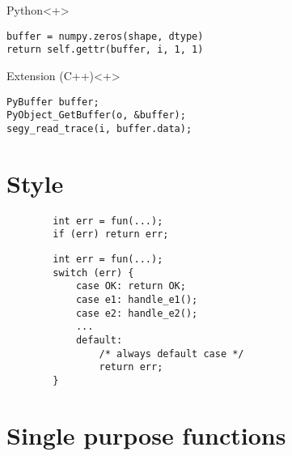 \documentclass[pdf]{beamer}
\begin{document}
\begin{frame}[fragile]
    \begin{block}{Python}<+>
        \begin{lstlisting}
buffer = numpy.zeros(shape, dtype)
return self.gettr(buffer, i, 1, 1)
        \end{lstlisting}
    \end{block}

    \begin{block}{Extension (C++)}<+>
        \begin{lstlisting}
PyBuffer buffer;
PyObject_GetBuffer(o, &buffer);
segy_read_trace(i, buffer.data);
        \end{lstlisting}
    \end{block}

\end{frame}

\section{Style}

\begin{frame}[fragile]
    \begin{lstlisting}
        int err = fun(...);
        if (err) return err;
    \end{lstlisting}

    \begin{lstlisting}
        int err = fun(...);
        switch (err) {
            case OK: return OK;
            case e1: handle_e1();
            case e2: handle_e2();
            ...
            default:
                /* always default case */
                return err;
        }
    \end{lstlisting}

\end{frame}

\section{Single purpose functions}
\end{document}
